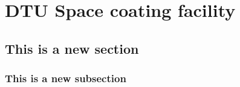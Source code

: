 \chapter{DTU Space coating facility}
\section{This is a new section}
\subsection{This is a new subsection}
